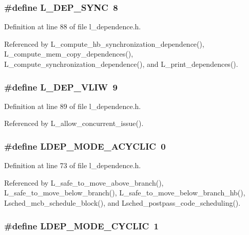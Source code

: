 \subsubsection{\setlength{\rightskip}{0pt plus 5cm}\#define L\_\-DEP\_\-SYNC~8}\label{l__dependence_8h_8a2cca461224abece7afb57e5ff2befe}




Definition at line 88 of file l\_\-dependence.h.

Referenced by L\_\-compute\_\-hb\_\-synchronization\_\-dependence(), L\_\-compute\_\-mem\_\-copy\_\-dependences(), L\_\-compute\_\-synchronization\_\-dependence(), and L\_\-print\_\-dependences().
\subsubsection{\setlength{\rightskip}{0pt plus 5cm}\#define L\_\-DEP\_\-VLIW~9}\label{l__dependence_8h_44966ab55c56638a952468d098a9e173}




Definition at line 89 of file l\_\-dependence.h.

Referenced by L\_\-allow\_\-concurrent\_\-issue().
\subsubsection{\setlength{\rightskip}{0pt plus 5cm}\#define LDEP\_\-MODE\_\-ACYCLIC~0}\label{l__dependence_8h_ca761b0b451255076f49e439051ff47d}




Definition at line 73 of file l\_\-dependence.h.

Referenced by L\_\-safe\_\-to\_\-move\_\-above\_\-branch(), L\_\-safe\_\-to\_\-move\_\-below\_\-branch(), L\_\-safe\_\-to\_\-move\_\-below\_\-branch\_\-hb(), Lsched\_\-mcb\_\-schedule\_\-block(), and Lsched\_\-postpass\_\-code\_\-scheduling().
\subsubsection{\setlength{\rightskip}{0pt plus 5cm}\#define LDEP\_\-MODE\_\-CYCLIC~1}\label{l__dependence_8h_e417dbe2c9f367eaf46cf098e476c6c3}





